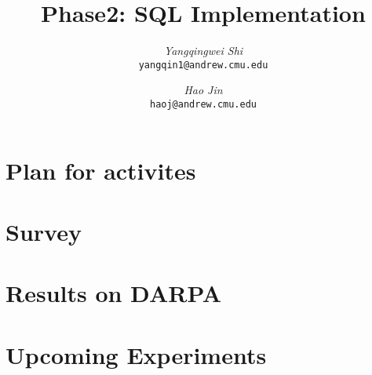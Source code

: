 \documentclass[12pt]{article}
\begin{document}
\newcommand{\beq}{\begin{equation}}
\newcommand{\eeq}{\end{equation}}
\newcommand{\bit}{\begin{itemize*}}
\newcommand{\eit}{\end{itemize*}}
\newcommand{\goal}[1]{ {\noindent {$\Rightarrow$} \em {#1} } }
\newcommand{\hide}[1]{}
\newcommand{\comment}[1]{ {\footnotesize {#1} } }
\newtheorem{lemma}{Lemma}
\newtheorem{theorem}{Theorem}
\newtheorem{proof}{Proof}
\newtheorem{defn}{Definition}
\newtheorem{algo}{Algorithm}
\newtheorem{observation}{Observation}

\title{Phase2: SQL Implementation}


\author{ {\em Yangqingwei Shi} \\	   
	    {\tt yangqin1@andrew.cmu.edu}
	 \and
	 {\em Hao Jin} \\
	     {\tt haoj@andrew.cmu.edu}}
\maketitle

\section{Plan for activites}
    \label{sec:intro}
    
\newpage
\section{Survey}
    \label{sec:survey}
    
 
\newpage
\section{Results on DARPA}
	\label{sec:exp}
	
	   
\newpage
\section{Upcoming Experiments}
	\label{sec:exp}
	
	
\newpage
	\label{sec:app}
	







\newpage
{}
\end{document}
